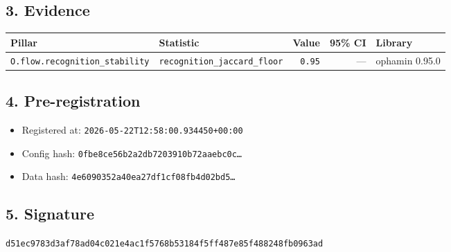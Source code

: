 \documentclass{article}
\begin{document}
\subsection*{3. Evidence}
\begin{tabular}{llrrl}\toprule
\textbf{Pillar} & \textbf{Statistic} & \textbf{Value} & \textbf{95\% CI} & \textbf{Library} \\\midrule
\texttt{O.flow.recognition\_stability} & \texttt{recognition\_jaccard\_floor} & \texttt{0.95} & --- & ophamin 0.95.0 \\
\bottomrule\end{tabular}
\subsection*{4. Pre-registration}
\begin{itemize}
\item Registered at: \texttt{2026-05-22T12:58:00.934450+00:00}
\item Config hash: \texttt{0fbe8ce56b2a2db7203910b72aaebc0c\dots}
\item Data hash: \texttt{4e6090352a40ea27df1cf08fb4d02bd5\dots}
\end{itemize}
\subsection*{5. Signature}
\texttt{d51ec9783d3af78ad04c021e4ac1f5768b53184f5ff487e85f488248fb0963ad}\\
\end{document}
